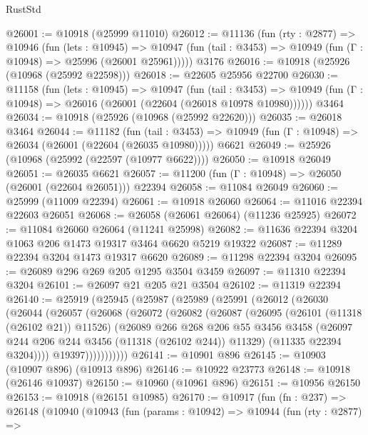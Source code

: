 \begin{lexlean}{RustStd}
\begin{coremodule}
{{{{{{{{{{{{{{{{{{{@26001 := @10918 (@25999 @11010)
@26012 := @11136
    (fun (rty : @2877) =>
    @10946
      (fun (lets : @10945) =>
      @10947 (fun (tail : @3453) => @10949 (fun (Γ : @10948) => @25996 (@26001 @25961)))))
    @3176
@26016 := @10918 (@25926 (@10968 (@25992 @22598)))
@26018 := @22605 @25956 @22700
@26030 := @11158
    (fun (lets : @10945) =>
    @10947
      (fun (tail : @3453) =>
      @10949 (fun (Γ : @10948) => @26016 (@26001 (@22604 (@26018 @10978 @10980))))))
    @3464
@26034 := @10918 (@25926 (@10968 (@25992 @22620)))
@26035 := @26018 @3464
@26044 := @11182
    (fun (tail : @3453) => @10949 (fun (Γ : @10948) => @26034 (@26001 (@22604 (@26035 @10980)))))
    @6621
@26049 := @25926 (@10968 (@25992 (@22597 (@10977 @6622))))
@26050 := @10918 @26049
@26051 := @26035 @6621
@26057 := @11200 (fun (Γ : @10948) => @26050 (@26001 (@22604 @26051))) @22394
@26058 := @11084 @26049
@26060 := @25999 (@11009 @22394)
@26061 := @10918 @26060
@26064 := @11016 @22394 @22603 @26051
@26068 := @26058 (@26061 @26064) (@11236 @25925)
@26072 := @11084 @26060 @26064 (@11241 @25998)
@26082 := @11636 @22394 @3204 @1063 @206 @1473 @19317 @3464 @6620 @5219 @19322
@26087 := @11289 @22394 @3204 @1473 @19317 @6620
@26089 := @11298 @22394 @3204
@26095 := @26089 @296 @269 @205 @1295 @3504 @3459
@26097 := @11310 @22394 @3204
@26101 := @26097 @21 @205 @21 @3504
@26102 := @11319 @22394
@26140 := @25919
    (@25945
      (@25987
        (@25989
          (@25991
            (@26012
              (@26030
                (@26044
                  (@26057
                    (@26068
                      (@26072
                        (@26082
                          (@26087
                            (@26095
                              (@26101 (@11318 (@26102 @21)) @11526)
                              (@26089
                                @266
                                @268
                                @206
                                @55
                                @3456
                                @3458
                                (@26097 @244 @206 @244 @3456 (@11318 (@26102 @244)) @11329)
                                (@11335 @22394 @3204))))
                          @19397)))))))))))
@26141 := @10901 @896
@26145 := @10903 (@10907 @896) (@10913 @896)
@26146 := @10922 @23773
@26148 := @10918 (@26146 @10937)
@26150 := @10960 (@10961 @896)
@26151 := @10956 @26150
@26153 := @10918 (@26151 @10985)
@26170 := @10917
    (fun (fn : @237) =>
    @26148
      (@10940
        (@10943
          (fun (params : @10942) =>
          @10944
            (fun (rty : @2877) =>
}}}}}}}}}}}}}}}}}}}
\end{coremodule}
\end{lexlean}
